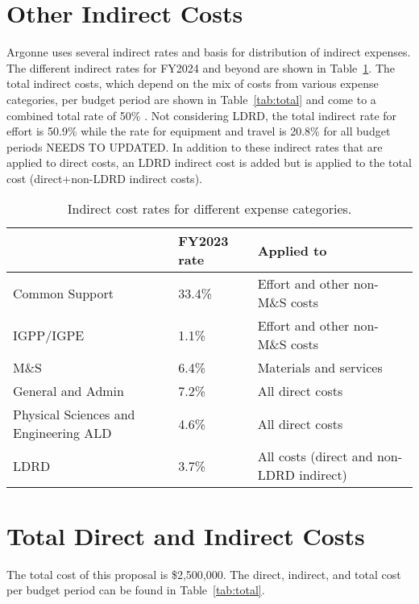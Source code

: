 \documentclass[letter, USenglish, 11pt, subfigure]{article}
\begin{document}
\section{Other Indirect Costs}
\label{subsec:otherIndirects}
Argonne uses several indirect rates and basis for distribution of indirect expenses. The different indirect rates for FY2024 and beyond are shown in Table~\ref{tab:indirectRates}. The total indirect costs, which depend on the mix of costs from various expense categories, per budget period are shown in Table~\ref{tab:total} and come to a combined total rate of { \color{red} 50\% . Not considering LDRD, the total indirect rate for effort is 50.9\% while the rate for equipment and travel is 20.8\% for all budget periods NEEDS TO UPDATED}. In addition to these indirect rates that are applied to direct costs, an LDRD indirect cost is added but is applied to the total cost (direct+non-LDRD indirect costs).

\begin{table}[!htpb]
  \begin{center}  
    \caption{Indirect cost rates for different expense categories.}
    \label{tab:indirectRates}
    \begin{tabular}{lll}
      \hline
      {} & FY2023 rate & Applied to  \\
      \hline
      Common Support & 33.4\% & Effort and other non-M\&S costs\\
      IGPP/IGPE & 1.1\% &  Effort and other non-M\&S costs \\
      M\&S & 6.4\% & Materials and services\\
      General and Admin & 7.2\% & All direct costs\\
      Physical Sciences and Engineering ALD & 4.6\% & All direct costs\\
      LDRD & 3.7\% & All costs (direct and non-LDRD indirect)\\
      \hline
    \end{tabular}
  \end{center}
\end{table}

%   
\section{Total Direct and Indirect Costs}
\label{subsec:totalCosts}
The total cost of this proposal is \$2,500,000. The direct, indirect, and total cost per budget period can be found in Table~\ref{tab:total}.
\end{document}
